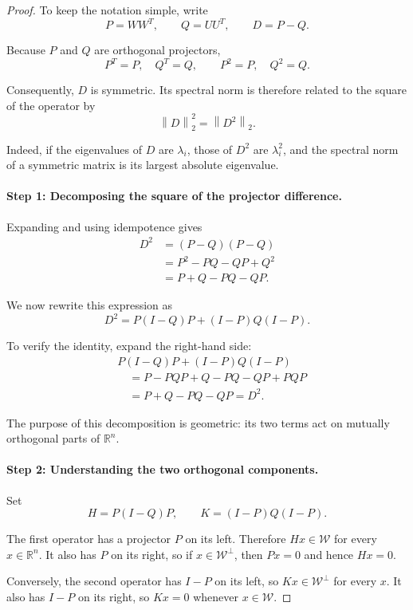 \documentclass[14pt,letterpaper]{article}
\theoremstyle{plain}
\theoremstyle{definition}
\theoremstyle{remark}
\newcommand{\R}{\mathbb{R}}
\newcommand{\norm}[1]{\left\lVert #1 \right\rVert}
\begin{document}
\begin{proof}

To keep the notation simple, write
\[
P=WW^T,\qquad Q=UU^T,\qquad D=P-Q.
\]

Because $P$ and $Q$ are orthogonal projectors,
\[
P^T=P,\quad Q^T=Q,
\qquad P^2=P,\quad Q^2=Q.
\]

Consequently, $D$ is symmetric. Its spectral norm is
therefore related to the square of the operator by
\[
\boxed{\norm{D}_2^2=\norm{D^2}_2.}
\]

Indeed, if the eigenvalues of $D$ are $\lambda_i$, those
of $D^2$ are $\lambda_i^2$, and the spectral norm of a
symmetric matrix is its largest absolute eigenvalue.

\paragraph{Step 1: Decomposing the square of the projector difference.}

Expanding and using idempotence gives
\[
\begin{aligned}
D^2
&=(P-Q)(P-Q)\\
&=P^2-PQ-QP+Q^2\\
&=P+Q-PQ-QP.
\end{aligned}
\]

We now rewrite this expression as
\[
\boxed{
D^2=P(I-Q)P+(I-P)Q(I-P).
}
\]

To verify the identity, expand the right-hand side:
\[
\begin{aligned}
&P(I-Q)P+(I-P)Q(I-P)\\
&\quad=P-PQP+Q-PQ-QP+PQP\\
&\quad=P+Q-PQ-QP=D^2.
\end{aligned}
\]

The purpose of this decomposition is geometric: its two
terms act on mutually orthogonal parts of $\R^n$.

\paragraph{Step 2: Understanding the two orthogonal components.}

Set
\[
H=P(I-Q)P,
\qquad
K=(I-P)Q(I-P).
\]

The first operator has a projector $P$ on its left.
Therefore $Hx\in\mathcal W$ for every $x\in\R^n$.
It also has $P$ on its right, so if
$x\in\mathcal W^\perp$, then $Px=0$ and hence $Hx=0$.

Conversely, the second operator has $I-P$ on its left,
so $Kx\in\mathcal W^\perp$ for every $x$. It also
has $I-P$ on its right, so $Kx=0$ whenever
$x\in\mathcal W$.


\end{proof}
\end{document}
